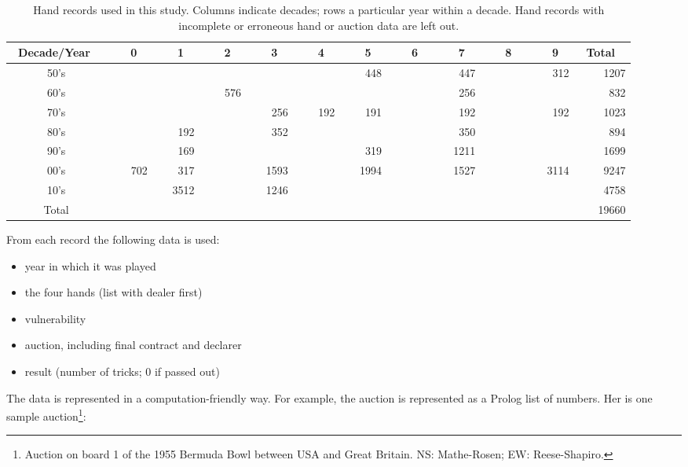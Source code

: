 \documentclass{llncs}
\begin{document}
\begin{table}
\centering\footnotesize
\caption{Hand records used in this study. Columns indicate decades;
  rows a particular year within  a decade. Hand records with
  incomplete or erroneous hand or auction data are left out.}
\label{tbl:data}
\begin{tabular}{|c|r|r|r|r|r|r|r|r|r|r|r|}
\hline
\bf\ Decade/Year \ &
\bf \ \ \ 0 \ &\bf \ \ \ 1 \ &\bf \ \ \ 2 \ &\bf \ \ \ 3 \ &\bf \ \ \ 4 \ &
\bf \ \ \ 5 \ &\bf \ \ \ 6 \ &\bf \ \ \ 7 \ &\bf \ \ \ 8 \ &\bf \ \ \ 9 \ &
\bf \ Total \ \\ \hline\hline
50's &  &  &  &  &  & 448 &  & 447 &  & 312 & 1207 \\ \hline
60's &  &  & 576 &  &  &  &  & 256 &  &  & 832 \\ \hline
70's &  &  &  & 256 & 192 & 191 &  & 192 &  & 192 & 1023 \\ \hline
80's &  & 192 &  & 352 &  &  &  & 350 &  &  & 894 \\ \hline
90's &  & 169 &  &  &  & 319 &  & 1211 &  &  & 1699 \\ \hline
00's & 702 & 317 &  & 1593 &  & 1994 &  & 1527 &  & 3114 & 9247 \\ \hline
10's &  & 3512 &  & 1246 &  &  &  &  &  &  & 4758 \\ \hline\hline
Total &  &  &  &  &  &  &  &  &  &  & 19660 \\ \hline
\hline
\end{tabular}
\end{table}

From each record the following data is used: 
\begin{itemize}
\item year in which it was played
\item the four hands (list with dealer first)
\item vulnerability
\item auction, including final contract and declarer
\item result (number of tricks; 0 if passed out)
\end{itemize}

The data is represented in a computation-friendly way. For example,
the auction is represented as a Prolog list of numbers. Her is one
sample auction\footnote{%
Auction on board 1 of the 1955 Bermuda Bowl between USA and Great
Britain. NS: Mathe-Rosen; EW: Reese-Shapiro.}:

\begin{code}
    [12,13,7,0,0,21,22,31,32,0,0,0]
\end{code}
\end{document}
